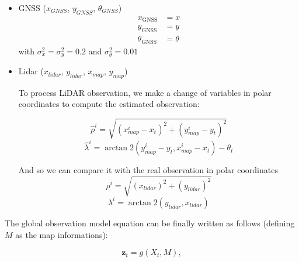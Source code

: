 \documentclass[conference]{IEEEtran}
\begin{document}
\vspace{2mm}
\begin{itemize}
    \item GNSS ($x_{GNSS}$, $y_{GNSS}$, $\theta_{GNSS}$)
    \begin{align*}
        x_\text{GNSS} &= x \\
        y_\text{GNSS} &= y \\
        \theta_\text{GNSS} &= \theta
    \end{align*}
    with $\sigma_{x}^{2} = \sigma_{y}^{2} = 0.2$ and $\sigma_{\theta}^{2} = 0.01$ 
    
    \vspace{4mm}

    \item Lidar ($x_{lidar}$, $y_{lidar}$, $x_{map}$, $y_{map}$)
   
    \vspace{2mm}
    
    To process LiDAR observation, we make a change of variables in polar coordinates to compute the estimated observation:

    \begin{equation*}
        \hat{\rho}^{i} = \sqrt{(x_{map}^{i} - x_t)^2 + (y_{map}^{i} - y_t)^2} 
    \end{equation*}
    \begin{equation*}
        \hat{\lambda}^{i} = \arctan2(y_{map}^{i} - y_t, x_{map}^{i} - x_t) - \theta_t
    \end{equation*}

    \noindent And so we can compare it with the real observation in polar coordinates
    \begin{equation*}
        \rho^{i} = \sqrt{(x_{lidar})^2 + (y_{lidar})^2} 
    \end{equation*}
    \begin{equation*}
        \lambda^{i} = \arctan2(y_{lidar}, x_{lidar})
    \end{equation*}
\end{itemize}

\vspace{2mm}

\noindent The global observation model equation can be finally written as follows (defining $M$ as the map informations):

\[
\mathbf{z}_t = g(X_t, M),
\]
\end{document}

